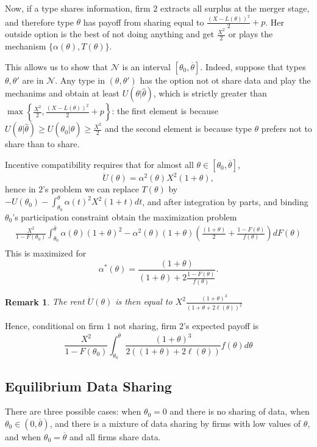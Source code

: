 \documentclass[a4paper]{article}
\newtheorem{remark}{Remark}
\newcommand{\N}{\mathcal N}
\renewcommand{\th}{\hat\theta}
\renewcommand{\t}{\theta}
\renewcommand{\a}{\alpha}
\begin{document}
Now, if a type shares information, firm $2$ extracts all surplus at the merger stage, and therefore type $\t$ has payoff from sharing equal to $\frac{(X-L(\t))^2}{2}+p$. Her outside option is the best of not doing anything and get $\frac{X^2}{2}$ or plays the mechanism $\{\a(\t),T(\t)\}$. 

This allows us to show that $\N$ is an interval $[\t_0,\overline \t]$. Indeed, suppose that types $\t,\t'$ are in $\N$. Any type in $(\t,\t')$ has the option not ot share data and play the mechanims and obtain at least $U(\t|\th)$, which is strictly greater than $\max\left\{\frac{X^2}{2}, \frac{(X-L(\t))^2}{2}+p\right\}$: the first element is because $U(\t|\th)\geq U(\t_0|\th)\geq \frac{X^2}{2}$ and the second element is because type $\t$ prefers not to share than to share. 

Incentive compatibility requires that for almost all $\t\in[\t_0,\overline \t]$, $$\dot U(\t)=\a^2(\t) X^2(1+\t),$$ hence in $2$'s problem we can replace $T(\t)$ by $-U(\t_0)-\int_{\t_0}^\t \a(t)^2 X^2(1+t)dt$, and after integration by parts, and binding $\t_0$'s participation constraint obtain the maximization problem
%
\begin{equation}
\begin{aligned}
    \frac{X^2}{1-F(\t_0)}\int_{\t_0}^{\overline \t}\a(\t) (1+\t)^2-\a^2(\t)(1+\t)\left(\frac{(1+\t)}{2}+\frac{1-F(\t)}{f(\t)}\right) dF(\t)\\
\end{aligned}
\end{equation}
This is maximized for 
%
\begin{equation}
    \a^*(\t)=\frac{(1+\t)}{(1+\t)+2 \frac{1-F(\t)}{f(\t)}}.
\end{equation}
%
\begin{remark}
    The rent $\dot U(\t)$ is then equal to $X^2\frac{(1+\t)^3}{(1+\t+2\ell(\t))^2}$
\end{remark}


Hence, conditional on firm $1$ not sharing, firm $2$'s expected payoff is 
%
\[
   \frac{X^2}{1-F(\t_0)}\int_{\t_0}^{\overline \t} \frac{(1+\t)^3}{2((1+\t)+2\ell(\t))}f(\t)d\t
\]
%



\subsection*{Equilibrium Data Sharing}
There are three possible cases: when $\t_0=0$ and there is no sharing of data, when $\t_0\in(0,\overline \t)$, and there is a mixture of data sharing by firms with low values of $\t$, and when $\t_0=\overline \t$ and all firms share data.
\end{document}
